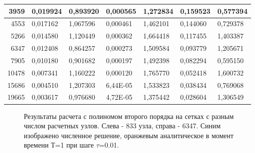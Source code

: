 \documentclass[14pt]{article}
\begin{document}
\begin{table}[H]
\begin{tabular}{|r|l|l|l|l|l|l|}
3959                        & 0,019924 & 0,893920               & 0,000565 & 1,272834 & 0,159523 & 0,577394               \\ \hline
4553                        & 0,017162 & 1,067596               & 0,000461 & 1,462101 & 0,144060 & 0,729378               \\ \hline
5266                        & 0,014580 & 1,120449               & 0,000362 & 1,664418 & 0,117455 & 1,403387               \\ \hline
6347                        & 0,012408 & 0,864257               & 0,000273 & 1,509584 & 0,093779 & 1,205671               \\ \hline
7905  & 0,010180 & 0,901682               & 0,000197 & 1,492398 & 0,082294 & 0,595150               \\ \hline
\multicolumn{1}{|l|}{10478} & 0,007341 & 1,160222               & 0,000120 & 1,765770 & 0,052418 & 1,600732               \\ \hline
\multicolumn{1}{|l|}{15686} & 0,004510 & 1,207303               & 6,44E-05 & 1,533823 & 0,038434 & 0,769068               \\ \hline
\multicolumn{1}{|l|}{19665} & 0,003617 & 0,976680               & 4,72E-05 & 1,375442 & 0,028604 & 1,306549               \\ \hline
\end{tabular}
\end{table}
\begin{figure}[H]
\caption{Результаты расчета с полиномом второго порядка на сетках с разным числом расчетных узлов. Слева - 833 узла, справа - 6347. Синим изображено численное решение, оранжевым аналитическое в момент времени Т=1 при шаге $\tau$=0.01.}
\end{figure}
\end{document}

